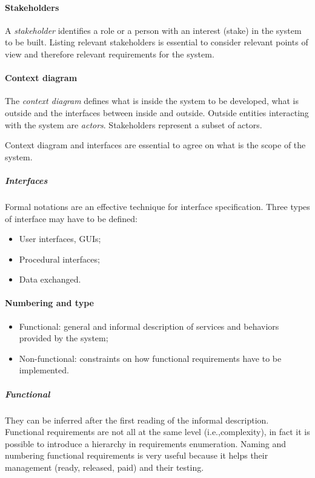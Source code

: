 \paragraph{Stakeholders}
A \emph{stakeholder} identifies a role or a person with an interest (stake) in the system to be built. Listing relevant stakeholders is essential to consider relevant points of view and therefore relevant requirements for the system.

\paragraph{Context diagram}
The \emph{context diagram} defines what is inside the system to be developed, what is outside and the interfaces between inside and outside. Outside entities interacting with the system are \textit{actors}. Stakeholders represent a subset of actors.

Context diagram and interfaces are essential to agree on what is the scope of the system.

\subparagraph{Interfaces}
Formal notations are an effective technique for interface specification.
Three types of interface may have to be defined:
\begin{itemize}
\item User interfaces, GUIs;
\item Procedural interfaces;
\item Data exchanged.
\end{itemize}

\paragraph{Numbering and type}
\begin{itemize}
\item Functional: general and informal description of services and behaviors provided by the system;
\item Non-functional: constraints on how functional requirements have to be implemented.
\end{itemize}

\subparagraph{Functional}
They can be inferred after the first reading of the informal description. Functional requirements are not all at the same level (i.e.,\@ complexity), in fact it is possible to introduce a hierarchy in requirements enumeration. Naming and numbering functional requirements is very useful because it helps their management (ready, released, paid) and their testing.

